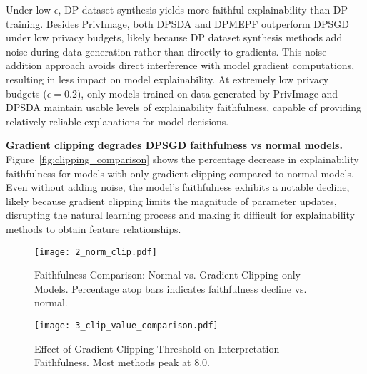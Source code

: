 \documentclass{article}
\begin{document}
Under low $\epsilon$, DP dataset synthesis yields more faithful explainability than DP training. Besides PrivImage, both DPSDA and DPMEPF outperform DPSGD under low privacy budgets, likely because DP dataset synthesis methods add noise during data generation rather than directly to gradients. This noise addition approach avoids direct interference with model gradient computations, resulting in less impact on model explainability. At extremely low privacy budgets ($\epsilon=0.2$), only models trained on data generated by PrivImage and DPSDA maintain usable levels of explainability faithfulness, capable of providing relatively reliable explanations for model decisions.

\begin{tcolorbox}[colback=gray!20, colframe=gray!20, boxrule=0pt, arc=0pt, left=5pt, right=5pt, top=5pt, bottom=5pt]
\noindent \textbf{Gradient clipping degrades DPSGD faithfulness vs normal models.} Figure~\ref{fig:clipping_comparison} shows the percentage decrease in explainability faithfulness for models with only gradient clipping compared to normal models. Even without adding noise, the model's faithfulness exhibits a notable decline, likely because gradient clipping limits the magnitude of parameter updates, disrupting the natural learning process and making it difficult for explainability methods to obtain feature relationships.
\end{tcolorbox}

\begin{figure}[!h]
\begin{minipage}[t]{0.48\columnwidth}
  \vspace{0pt} %
  \texttt{[image: 2\_norm\_clip.pdf]}
  \caption{Faithfulness Comparison: Normal vs. Gradient Clipping-only Models. Percentage atop bars indicates faithfulness decline vs. normal.}
  \label{fig:clipping_comparison}
\end{minipage}
\hfill
\begin{minipage}[t]{0.48\columnwidth}
  \vspace{0pt} %
  \texttt{[image: 3\_clip\_value\_comparison.pdf]}
  \caption{Effect of Gradient Clipping Threshold on Interpretation Faithfulness. Most methods peak at 8.0.}
  \label{fig:clipping_threshold}
\end{minipage}
\end{figure}
\end{document}
